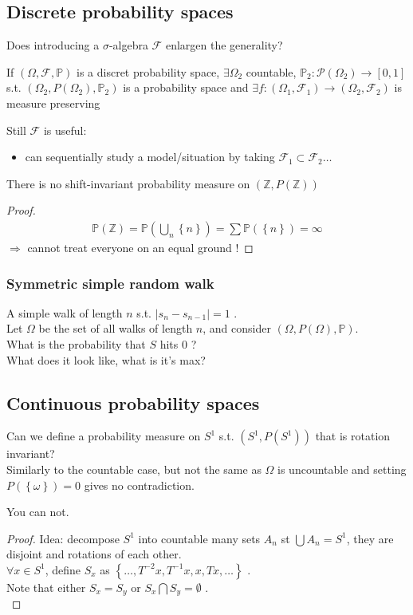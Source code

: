 \documentclass[../main.tex]{subfiles}
\begin{document}
\subsection{Discrete probability spaces}
Does introducing a $\sigma$-algebra $\mathcal{F}$ enlargen the generality?
\begin{propo}
	If $( \Omega, \mathcal{F}, \mathbb{P}) $ is a discret probability space, $\exists \Omega_2$ countable, $\mathbb{P}_2: \mathcal{P}( \Omega_2) \to [ 0,1] $ s.t. $( \Omega_2, P( \Omega_2) , \mathbb{P}_2) $ is a probability space and $\exists f: ( \Omega_1, \mathcal{F}_1) \to ( \Omega_2, \mathcal{F}_2) $ is measure preserving
\end{propo}
Still $\mathcal{F}$ is useful:
\begin{itemize}
\item can sequentially study a model/situation by taking $ \mathcal{F}_1 \subset \mathcal{F}_2 \ldots$ 
\end{itemize}
\begin{lemma}
	There is no shift-invariant probability measure on $ ( \mathbb{Z},P( \mathbb{Z}) ) $ 
\end{lemma}
\begin{proof}
\begin{align*}
	\mathbb{P}( \mathbb{Z}) = \mathbb{P}( \bigcup_n \left\{ n \right\} ) = \sum \mathbb{P}( \left\{ n \right\} )  = \infty 	
\end{align*}
$\Rightarrow$ cannot treat everyone on an equal ground !
\end{proof}
\subsubsection{Symmetric simple random walk}
A simple walk of length $n$ s.t. $|s_n-s_{n-1} | = 1 $ .\\
Let $\Omega$ be the set of all walks of length $n$, and consider $( \Omega, P( \Omega) , \mathbb{P}) $.\\
What is the probability that $S$ hits $0$ ?\\
What does it look like, what is it's max?
\subsection{Continuous probability spaces}
Can we define a probability measure on $S^{1}$ s.t. $( S^{1}, P( S^{1}) ) $ that is rotation invariant?\\
Similarly to the countable case, but not the same as $\Omega$ is uncountable and setting $P( \left\{ \omega \right\} ) =0$ gives no contradiction.
\begin{propo}
You can not.
\end{propo}
\begin{proof}
Idea: decompose $S^{1}$ into countable many sets $A_n$ st $\bigcup A_n = S^{1}$, they are disjoint and rotations of each other.\\
$\forall x \in S^{1}$, define $S_x$ as $ \left\{ \ldots, T^{-2}x, T^{-1}x, x, Tx, \ldots  \right\} $ .\\
Note that either $S_x= S_y$ or $S_x \bigcap S_y = \emptyset$ .\\
\end{proof}




	
\end{document}
